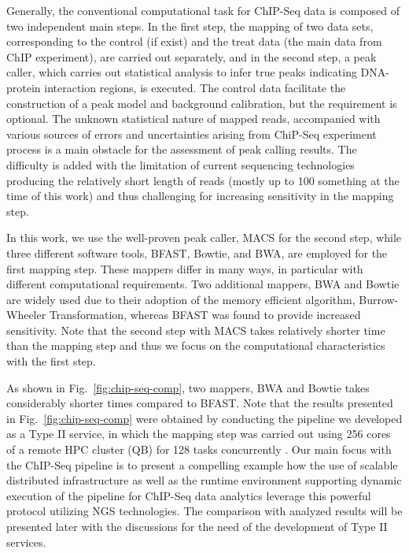 \documentclass{cpeauth}
\begin{document}
 Generally, the conventional computational task for ChIP-Seq data is composed of two
 independent main steps\cite{pepke2009}.  In the first step,
 the mapping of two data sets, corresponding to the control (if exist) and the
 treat data (the main data from ChIP experiment), are carried out separately, and in the second step, a
 peak caller, which carries out statistical analysis to infer true
 peaks indicating DNA-protein interaction regions, is executed.  The
 control data facilitate the construction of a peak model and
 background calibration, but the requirement is optional.  The unknown statistical
 nature of mapped reads, accompanied with various sources of errors and uncertainties arising from ChiP-Seq
 experiment process is a main obstacle for the assessment of peak calling results.  The difficulty is added with the limitation of current sequencing technologies producing the relatively short length of reads
 (mostly up to 100 something at the time of this work) and thus challenging for increasing
 sensitivity in the mapping step\cite{pepke2009,laajala,wilbanks}.
 
 In this work, we use the well-proven peak caller, MACS\cite{macs} for
 the second step, while three different software tools, BFAST, Bowtie,
 and BWA, are employed for the first mapping step.  These mappers
 differ in many ways, in particular with different computational
 requirements.  Two additional mappers, BWA and Bowtie are widely used
 due to their adoption of the memory efficient algorithm,
 Burrow-Wheeler Transformation, whereas BFAST was found to provide
 increased sensitivity\cite{bfast2009,mapping-survey}.  Note that the second step with MACS takes relatively shorter time than the mapping step and thus we focus on the computational characteristics with the first step.  
 
 As shown in Fig.~\ref{fig:chip-seq-comp}, two mappers, BWA and Bowtie takes
 considerably shorter times compared to BFAST.  Note that the results
 presented in Fig.~\ref{fig:chip-seq-comp} were obtained by conducting
 the pipeline we developed as a Type II service, in which the mapping step was carried out using
 256 cores of a remote HPC cluster (QB) for 128 tasks concurrently .  Our main focus with the
 ChIP-Seq pipeline is to present a compelling example how the use of
 scalable distributed infrastructure as well as the runtime
 environment supporting dynamic execution of the pipeline for ChIP-Seq
 data analytics leverage this powerful protocol utilizing NGS
 technologies.  The comparison with analyzed results will be presented later with the discussions for the need of the development of Type II services. 
\end{document}
